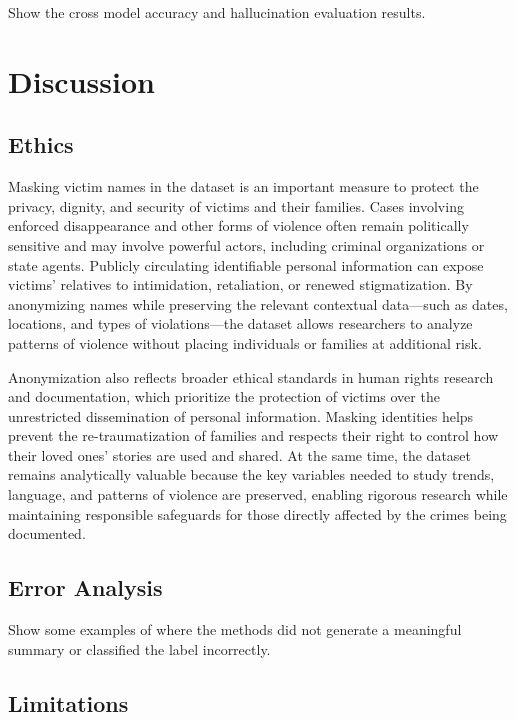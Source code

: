 \documentclass{article}
\begin{document}
Show the cross model accuracy and hallucination evaluation results.

\section{Discussion}\label{discussion}

\subsection{Ethics}\label{ethics}

Masking victim names in the dataset is an important measure to protect the privacy, dignity, and security of victims and their families. Cases involving enforced disappearance and other forms of violence often remain politically sensitive and may involve powerful actors, including criminal organizations or state agents. Publicly circulating identifiable personal information can expose victims’ relatives to intimidation, retaliation, or renewed stigmatization. By anonymizing names while preserving the relevant contextual data—such as dates, locations, and types of violations—the dataset allows researchers to analyze patterns of violence without placing individuals or families at additional risk.

Anonymization also reflects broader ethical standards in human rights research and documentation, which prioritize the protection of victims over the unrestricted dissemination of personal information. Masking identities helps prevent the re-traumatization of families and respects their right to control how their loved ones’ stories are used and shared. At the same time, the dataset remains analytically valuable because the key variables needed to study trends, language, and patterns of violence are preserved, enabling rigorous research while maintaining responsible safeguards for those directly affected by the crimes being documented.


\subsection{Error Analysis}\label{error-analysis}

Show some examples of where the methods did not generate a meaningful
summary or classified the label incorrectly.

\subsection{Limitations}\label{limitations}
\end{document}
